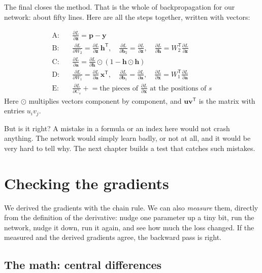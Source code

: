 \documentclass[11pt,a4paper,oneside,openany]{book}
\newcommand{\code}[1]{\texttt{\detokenize{#1}}}
\newcommand{\vect}[1]{\mathbf{#1}}
\newcommand{\pd}[2]{\frac{\partial #1}{\partial #2}}
\begin{document}
The final \code{end} closes the method. That is the whole of
backpropagation for our network: about fifty lines. Here are all the
steps together, written with vectors:

\begin{mathbox}
\begin{align*}
  \text{A:}\quad & \pd{L}{\vect{z}} = \vect{p} - \vect{y}\\
  \text{B:}\quad & \pd{L}{W_2} = \pd{L}{\vect{z}}\,\vect{h}^{\mathsf T},\quad
                   \pd{L}{\vect{b}_2} = \pd{L}{\vect{z}},\quad
                   \pd{L}{\vect{h}} = W_2^{\mathsf T}\pd{L}{\vect{z}}\\
  \text{C:}\quad & \pd{L}{\vect{a}} = \pd{L}{\vect{h}} \odot (1 - \vect{h}\odot\vect{h})\\
  \text{D:}\quad & \pd{L}{W_1} = \pd{L}{\vect{a}}\,\vect{x}^{\mathsf T},\quad
                   \pd{L}{\vect{b}_1} = \pd{L}{\vect{a}},\quad
                   \pd{L}{\vect{x}} = W_1^{\mathsf T}\pd{L}{\vect{a}}\\
  \text{E:}\quad & \pd{L}{C_{s}} \mathrel{+}= \text{the pieces of } \pd{L}{\vect{x}} \text{ at the positions of } s
\end{align*}
Here $\odot$ multiplies vectors component by component, and
$\vect{u}\vect{v}^{\mathsf T}$ is the matrix with entries $u_i v_j$.
\end{mathbox}

But is it right? A mistake in a formula or an index here would not crash
anything. The network would simply learn badly, or not at all, and it
would be very hard to tell why. The next chapter builds a test that
catches such mistakes.

\chapter{Checking the gradients}

We derived the gradients with the chain rule. We can also
\emph{measure} them, directly from the definition of the derivative:
nudge one parameter up a tiny bit, run the network, nudge it down, run it
again, and see how much the loss changed. If the measured and the derived
gradients agree, the backward pass is right.

\section{The math: central differences}
\end{document}
